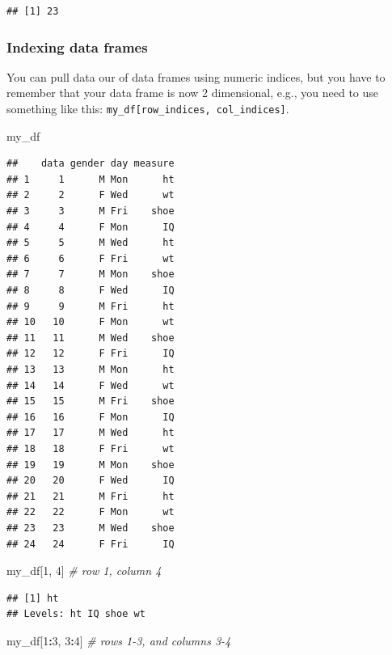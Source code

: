 \documentclass[]{article}
\newenvironment{Shaded}{\begin{snugshade}}{\end{snugshade}}
\newcommand{\DecValTok}[1]{\textcolor[rgb]{0.00,0.00,0.81}{#1}}
\newcommand{\CommentTok}[1]{\textcolor[rgb]{0.56,0.35,0.01}{\textit{#1}}}
\newcommand{\OperatorTok}[1]{\textcolor[rgb]{0.81,0.36,0.00}{\textbf{#1}}}
\newcommand{\NormalTok}[1]{#1}
\begin{document}
\begin{verbatim}
## [1] 23
\end{verbatim}

\subsubsection{Indexing data frames}\label{indexing-data-frames}

You can pull data our of data frames using numeric indices, but you have
to remember that your data frame is now 2 dimensional, e.g., you need to
use something like this:
\texttt{my\_df{[}row\_indices,\ col\_indices{]}}.

\begin{Shaded}
\begin{Highlighting}[]
\NormalTok{my_df}
\end{Highlighting}
\end{Shaded}

\begin{verbatim}
##    data gender day measure
## 1     1      M Mon      ht
## 2     2      F Wed      wt
## 3     3      M Fri    shoe
## 4     4      F Mon      IQ
## 5     5      M Wed      ht
## 6     6      F Fri      wt
## 7     7      M Mon    shoe
## 8     8      F Wed      IQ
## 9     9      M Fri      ht
## 10   10      F Mon      wt
## 11   11      M Wed    shoe
## 12   12      F Fri      IQ
## 13   13      M Mon      ht
## 14   14      F Wed      wt
## 15   15      M Fri    shoe
## 16   16      F Mon      IQ
## 17   17      M Wed      ht
## 18   18      F Fri      wt
## 19   19      M Mon    shoe
## 20   20      F Wed      IQ
## 21   21      M Fri      ht
## 22   22      F Mon      wt
## 23   23      M Wed    shoe
## 24   24      F Fri      IQ
\end{verbatim}

\begin{Shaded}
\begin{Highlighting}[]
\NormalTok{my_df[}\DecValTok{1}\NormalTok{, }\DecValTok{4}\NormalTok{]  }\CommentTok{# row 1, column 4}
\end{Highlighting}
\end{Shaded}

\begin{verbatim}
## [1] ht
## Levels: ht IQ shoe wt
\end{verbatim}

\begin{Shaded}
\begin{Highlighting}[]
\NormalTok{my_df[}\DecValTok{1}\OperatorTok{:}\DecValTok{3}\NormalTok{, }\DecValTok{3}\OperatorTok{:}\DecValTok{4}\NormalTok{]  }\CommentTok{# rows 1-3, and columns 3-4}
\end{Highlighting}
\end{Shaded}
\end{document}
